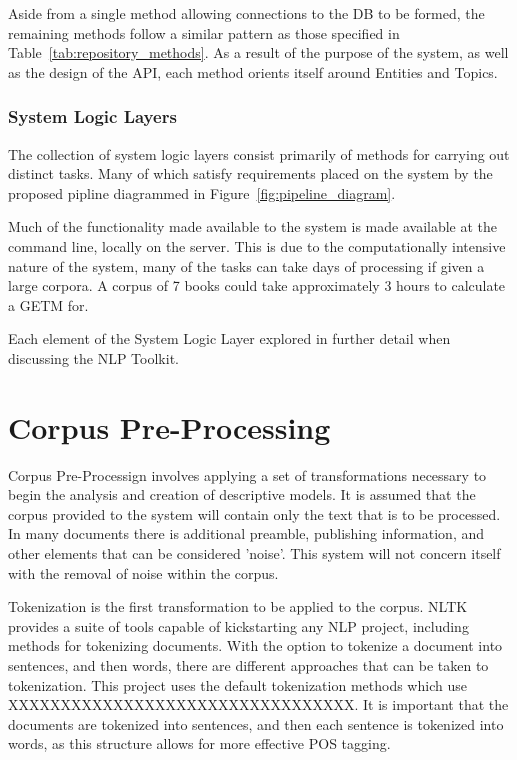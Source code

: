 \documentclass[10pt]{report}
\begin{document}
Aside from a single method allowing connections to the DB to be formed, the remaining methods follow a similar pattern as those specified in Table~\ref{tab:repository_methods}. As a result of the purpose of the system, as well as the design of the API, each method orients itself around Entities and Topics.

\subsubsection{System Logic Layers}
The collection of system logic layers consist primarily of methods for carrying out distinct tasks. Many of which satisfy requirements placed on the system by the proposed pipline diagrammed in Figure~\ref{fig:pipeline_diagram}.

Much of the functionality made available to the system is made available at the command line, locally on the server. This is due to the computationally intensive nature of the system, many of the tasks can take days of processing if given a large corpora. A corpus of 7 books could take approximately 3 hours to calculate a GETM for.

Each element of the System Logic Layer explored in further detail when discussing the NLP Toolkit.


\section{Corpus Pre-Processing}

Corpus Pre-Processign involves applying a set of transformations necessary to begin the analysis and creation of descriptive models. It is assumed that the corpus provided to the system will contain only the text that is to be processed. In many documents there is additional preamble, publishing information, and other elements that can be considered 'noise'. This system will not concern itself with the removal of noise within the corpus.

Tokenization is the first transformation to be applied to the corpus. NLTK provides a suite of tools capable of kickstarting any NLP project, including methods for tokenizing documents. With the option to tokenize a document into sentences, and then words, there are different approaches that can be taken to tokenization. This project uses the default tokenization methods which use XXXXXXXXXXXXXXXXXXXXXXXXXXXXXXXXX. It is important that the documents are tokenized into sentences, and then each sentence is tokenized into words, as this structure allows for more effective POS tagging.
\end{document}
